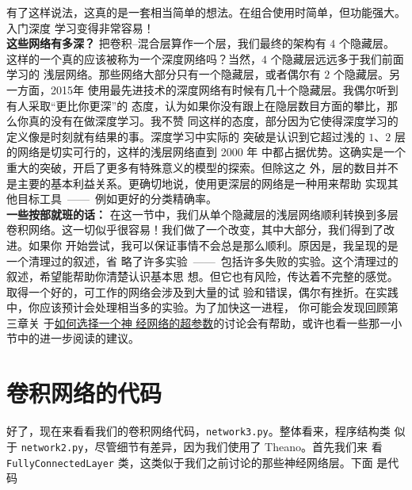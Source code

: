 有了这样说法，这真的是一套相当简单的想法。在组合使用时简单，但功能强大。入门深度
学习变得非常容易！\\

\textbf{这些网络有多深？} 把卷积--混合层算作一个层，我们最终的架构有 $4$ 个隐藏层。
这样的一个真的应该被称为一个深度网络吗？当然，$4$ 个隐藏层远远多于我们前面学习的
浅层网络。那些网络大部分只有一个隐藏层，或者偶尔有 $2$ 个隐藏层。另一方面，2015年
使用最先进技术的深度网络有时候有几十个隐藏层。我偶尔听到有人采取“更比你更深”的
态度，认为如果你没有跟上在隐层数目方面的攀比，那么你真的没有在做深度学习。我不赞
同这样的态度，部分因为它使得深度学习的定义像是时刻就有结果的事。深度学习中实际的
突破是认识到它超过浅的 $1$、$2$ 层的网络是切实可行的，这样的浅层网络直到 2000 年
中都占据优势。这确实是一个重大的突破，开启了更多有特殊意义的模型的探索。但除这之
外，层的数目并不是主要的基本利益关系。更确切地说，使用更深层的网络是一种用来帮助
实现其他目标工具~——~例如更好的分类精确率。
\\

\textbf{一些按部就班的话：} 在这一节中，我们从单个隐藏层的浅层网络顺利转换到多层
卷积网络。这一切似乎很容易！我们做了一个改变，其中大部分，我们得到了改进。如果你
开始尝试，我可以保证事情不会总是那么顺利。原因是，我呈现的是一个清理过的叙述，省
略了许多实验~——~包括许多失败的实验。这个清理过的叙述，希望能帮助你清楚认识基本思
想。但它也有风险，传达着不完整的感觉。取得一个好的，可工作的网络会涉及到大量的试
验和错误，偶尔有挫折。在实践中，你应该预计会处理相当多的实验。为了加快这一进程，
你可能会发现回顾第三章关
于\hyperref[sec:how_to_choose_a_neural_network's_hyper-parameters]{如何选择一个神
  经网络的超参数}的讨论会有帮助，或许也看一些那一小节中的进一步阅读的建议。

\section{卷积网络的代码}
\label{sec:the_code_for_our_convolutional_networks}

好了，现在来看看我们的卷积网络代码，\lstinline!network3.py!。整体看来，程序结构类
似于 \lstinline!network2.py!，尽管细节有差异，因为我们使用了 Theano。首先我们来
看 \lstinline!FullyConnectedLayer! 类，这类似于我们之前讨论的那些神经网络层。下面
是代码

